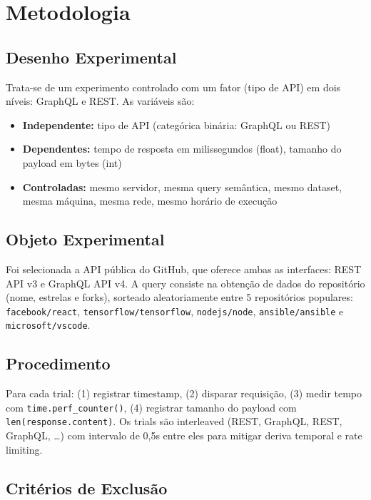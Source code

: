 \section{Metodologia}

\subsection{Desenho Experimental}

Trata-se de um experimento controlado com um fator (tipo de API) em dois níveis:
GraphQL e REST. As variáveis são:

\begin{itemize}
    \item \textbf{Independente:} tipo de API (categórica binária: GraphQL ou REST)
    \item \textbf{Dependentes:} tempo de resposta em milissegundos (float),
          tamanho do payload em bytes (int)
    \item \textbf{Controladas:} mesmo servidor, mesma query semântica,
          mesmo dataset, mesma máquina, mesma rede, mesmo horário de execução
\end{itemize}

\subsection{Objeto Experimental}

Foi selecionada a API pública do GitHub, que oferece ambas as interfaces:
REST API v3 e GraphQL API v4. A query consiste na obtenção de dados do
repositório (nome, estrelas e forks), sorteado aleatoriamente entre 5
repositórios populares: \texttt{facebook/react}, \texttt{tensorflow/tensorflow},
\texttt{nodejs/node}, \texttt{ansible/ansible} e \texttt{microsoft/vscode}.

\subsection{Procedimento}

Para cada trial: (1) registrar timestamp, (2) disparar requisição,
(3) medir tempo com \texttt{time.perf\_counter()}, (4) registrar tamanho do
payload com \texttt{len(response.content)}. Os trials são interleaved
(REST, GraphQL, REST, GraphQL, \dots) com intervalo de 0,5s entre eles
para mitigar deriva temporal e rate limiting.

\subsection{Critérios de Exclusão}

